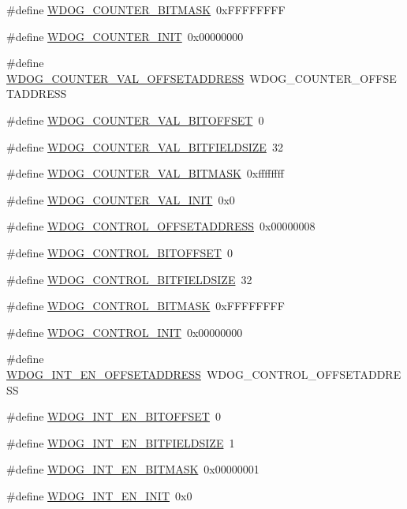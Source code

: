 \begin{DoxyCompactItemize}
\item 
\#define \hyperlink{a00577_a7ecbbd0b3bf737926002c3141ac94a14}{WDOG\_\-COUNTER\_\-BITMASK}~0xFFFFFFFF
\item 
\#define \hyperlink{a00577_a7e22e9a0aef302720900dbf69b14fc76}{WDOG\_\-COUNTER\_\-INIT}~0x00000000
\item 
\#define \hyperlink{a00577_a9b219f713f3feedc564098f4c3f7b804}{WDOG\_\-COUNTER\_\-VAL\_\-OFFSETADDRESS}~WDOG\_\-COUNTER\_\-OFFSETADDRESS
\item 
\#define \hyperlink{a00577_a4a328ff04e1e18927ed0826325994688}{WDOG\_\-COUNTER\_\-VAL\_\-BITOFFSET}~0
\item 
\#define \hyperlink{a00577_a1710d0675e6a6618377ac4115cfda648}{WDOG\_\-COUNTER\_\-VAL\_\-BITFIELDSIZE}~32
\item 
\#define \hyperlink{a00577_a3c7ef8c52e67506a942ae1faf8bb92e0}{WDOG\_\-COUNTER\_\-VAL\_\-BITMASK}~0xffffffff
\item 
\#define \hyperlink{a00577_a30e12747e5273f531dc25a5b5992ee73}{WDOG\_\-COUNTER\_\-VAL\_\-INIT}~0x0
\item 
\#define \hyperlink{a00577_ad266a7f3003992dc2d46c0987ab28621}{WDOG\_\-CONTROL\_\-OFFSETADDRESS}~0x00000008
\item 
\#define \hyperlink{a00577_a16798fd31fe8aeebc793a5c465408d58}{WDOG\_\-CONTROL\_\-BITOFFSET}~0
\item 
\#define \hyperlink{a00577_a21843d7aa941466cfed2acfcea70a3e6}{WDOG\_\-CONTROL\_\-BITFIELDSIZE}~32
\item 
\#define \hyperlink{a00577_ab97e5cb7421a11a5b3e2766faa2d456f}{WDOG\_\-CONTROL\_\-BITMASK}~0xFFFFFFFF
\item 
\#define \hyperlink{a00577_a6d3199cc84308abe35f744ebdb93c63e}{WDOG\_\-CONTROL\_\-INIT}~0x00000000
\item 
\#define \hyperlink{a00577_a8ba515cdefaacabdc710247515eb899a}{WDOG\_\-INT\_\-EN\_\-OFFSETADDRESS}~WDOG\_\-CONTROL\_\-OFFSETADDRESS
\item 
\#define \hyperlink{a00577_abdb253bc52e1f6d3fe4be48926cb438c}{WDOG\_\-INT\_\-EN\_\-BITOFFSET}~0
\item 
\#define \hyperlink{a00577_a13ef79b9ba85aabd21b971dd867cd409}{WDOG\_\-INT\_\-EN\_\-BITFIELDSIZE}~1
\item 
\#define \hyperlink{a00577_a5b8c896a6cc197aa720ddfebfcfb61ad}{WDOG\_\-INT\_\-EN\_\-BITMASK}~0x00000001
\item 
\#define \hyperlink{a00577_a23a8afbfb948ae01a4360ad4ff0a9047}{WDOG\_\-INT\_\-EN\_\-INIT}~0x0
\item 

\end{DoxyCompactItemize}
